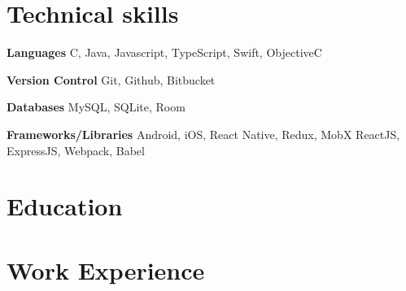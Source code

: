 \documentclass[11pt,a4paper]{moderncv}
\begin{document}
\maketitle

\section{Technical skills}

    \textbf{Languages}
           {C, Java, Javascript, TypeScript, Swift, ObjectiveC}

    \textbf{Version Control}
           {Git, Github, Bitbucket}

    \textbf{Databases}
           {MySQL, SQLite, Room}

    \textbf{Frameworks/Libraries}
           {Android, iOS, React Native, Redux, MobX}
           {ReactJS, ExpressJS, Webpack, Babel}

\section{Education}

\section{Work Experience}
\end{document}
